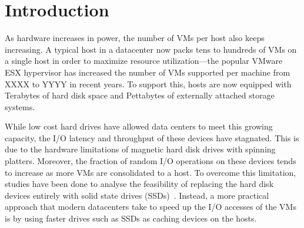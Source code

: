 
%
%

\section{Introduction}
As hardware increases in power, the number of VMs per host also keeps increasing. A typical host in a datacenter now packs tens to hundreds of VMs on a single host in order to maximize resource utilization---the popular VMware ESX hypervisor has increased the number of VMs supported per machine from XXXX to YYYY in recent years. To support this, hosts are now equipped with Terabytes of hard disk space and Pettabytes of externally attached storage systems.

While low cost hard drives have allowed data centers to meet this growing capacity, the I/O latency and throughput of these devices have stagnated. This is due to the hardware limitations of magnetic hard disk drives with spinning platters. Moreover, the fraction of random I/O operations on these devices tends to increase as more VMs are consolidated to a host. To overcome this limitation, studies have been done to analyse the feasibility of replacing the hard disk devices entirely with solid state drives (SSDs)~\cite{narayanan_migrating_2009}. Instead, a more practical approach that modern datacenters take to speed up the I/O accesses of the VMs is by using faster drives such as SSDs as caching devices on the hosts.

